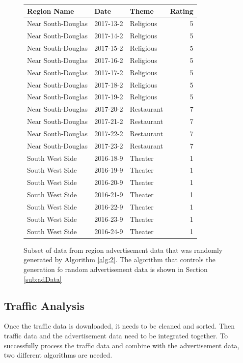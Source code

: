 \documentclass[titlepage,twocolumn]{article}
\begin{document}
\begin{figure}[h]
	\centering
	\footnotesize
	\begin{tabular}{|l|l|l|r|}
		\hline
		Region Name & Date & Theme & Rating \\
		\hline
		Near South-Douglas & 2017-13-2 & Religious & 5 \\
		Near South-Douglas & 2017-14-2 & Religious & 5 \\
		Near South-Douglas & 2017-15-2 & Religious & 5 \\
		Near South-Douglas & 2017-16-2 & Religious & 5 \\
		Near South-Douglas & 2017-17-2 & Religious & 5 \\
		Near South-Douglas & 2017-18-2 & Religious & 5 \\
		Near South-Douglas & 2017-19-2 & Religious & 5 \\
		Near South-Douglas & 2017-20-2 & Restaurant & 7 \\
		Near South-Douglas & 2017-21-2 & Restaurant & 7 \\
		Near South-Douglas & 2017-22-2 & Restaurant & 7 \\
		Near South-Douglas & 2017-23-2 & Restaurant & 7 \\
		South West Side & 2016-18-9 & Theater & 1 \\
		South West Side & 2016-19-9 & Theater & 1 \\
		South West Side & 2016-20-9 & Theater & 1 \\
		South West Side & 2016-21-9 & Theater & 1 \\
		South West Side & 2016-22-9 & Theater & 1 \\
		South West Side & 2016-23-9 & Theater & 1 \\
		South West Side & 2016-24-9 & Theater & 1 \\
		\hline
	\end{tabular}%
	\label{tab:regionAdsTable}%
	\caption{\small Subset of data from region advertisement data that was randomly generated by Algorithm \ref{alg:2}. The algorithm that controls the generation fo random advertisement data is shown in Section \ref{sub:adData}}
\end{figure}%


\subsection{Traffic Analysis}

\par Once the traffic data is downloaded, it needs to be cleaned and sorted. Then traffic data and the advertisement data need to be integrated together. To successfully process the traffic data and combine with the advertisement data, two different algorithms are needed. 
\end{document}
